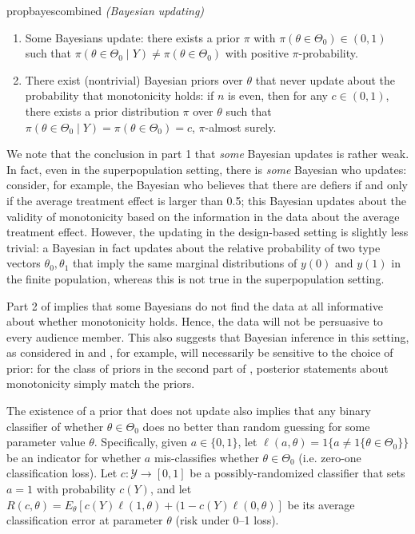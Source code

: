 \documentclass[12pt,reqno]{amsart}
\begin{document}
\begin{restatable}{prop}{bayescombined}
\label{prop:bayescombined}
\emph{(Bayesian updating)}
\begin{enumerate}
    \item 
    Some Bayesians update: there exists a prior $\pi$ with $\pi
    (\theta \in \Theta_0) \in (0,1)$ such that $\pi(\theta \in \Theta_0 \mid Y) \neq \pi(\theta \in \Theta_0)$ with
    positive $\pi$-probability.

    \item
    There exist (nontrivial) Bayesian priors over $\theta$ that never update about the probability that monotonicity holds: if $n$ is even, then for any $c \in (0,1)$, there exists a prior distribution $\pi$ over $\theta$ such that $\pi(\theta \in \Theta_0 \mid Y) = \pi(\theta \in \Theta_0) =c$, $\pi$-almost surely.
\end{enumerate}
\end{restatable}

We note that the conclusion in part 1 that \emph{some} Bayesian updates is rather weak. In fact, even in the superpopulation setting, there is \emph{some} Bayesian who updates: consider, for example, the Bayesian who believes that there are defiers if and only if the average treatment effect is larger than 0.5; this Bayesian updates about the validity of monotonicity based on the information in the data about the average treatment effect. However, the updating in the design-based setting is slightly less trivial: a Bayesian in fact updates about the relative probability of two type vectors $\theta_0, \theta_1$ that imply the same marginal distributions of $y(0)$ and $y(1)$ in the finite population, whereas this is not true in the superpopulation setting. 

Part 2 of  implies that some Bayesians do not find the data at all informative about whether monotonicity holds. Hence, the data will not be persuasive to every audience member. This also suggests that Bayesian inference in this setting, as considered in \citet{ding_model-free_2019} and \citet{christy_counting_2025}, for example, will necessarily be sensitive to the choice of prior: for the class of priors in the second part of , posterior statements about monotonicity simply match the priors. 

The existence of a prior that does not update also implies that any binary classifier of whether $\theta \in \Theta_0$ does no better than random guessing for some parameter value $\theta$. Specifically, given $a \in \{0,1\}$, let $\ell(a,\theta) = 1\{a \neq 1\{\theta \in \Theta_0 \} \}$ be an indicator for whether $a$ mis-classifies whether $\theta \in \Theta_0$ (i.e. zero-one classification loss). Let $c: \mathcal{Y} \to [0,1]$ be a possibly-randomized classifier that sets $a=1$ with probability $c(Y)$, and let $R(c,\theta) = E_\theta[ c(Y)\ell(1,\theta) + (1-c(Y) \ell(0,\theta)]$ be its average classification error at parameter $\theta$ (risk under 0--1 loss).
\end{document}
